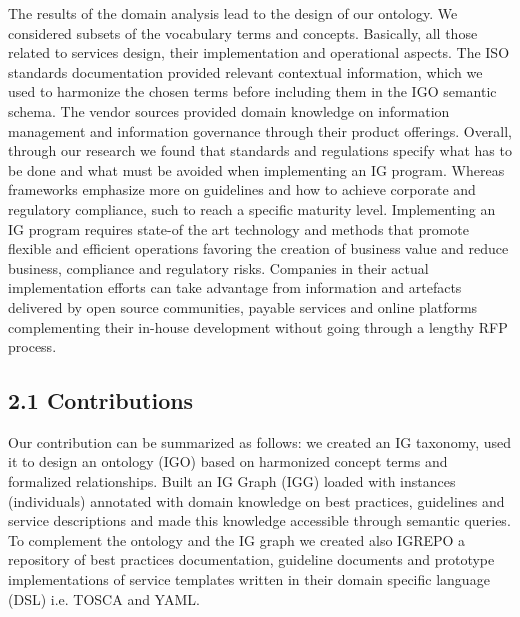 The results of the domain analysis lead to the design of our ontology. We considered subsets of the vocabulary terms and concepts. Basically, all those related to services design, their implementation and operational aspects. The ISO standards documentation provided relevant contextual information, which we used to harmonize the chosen terms before including them in the IGO semantic schema. The vendor sources provided domain knowledge on information management and information governance through their product offerings. Overall, through our research we found that standards and regulations specify what has to be done and what must be avoided when implementing an IG program. Whereas frameworks emphasize more on guidelines and how to achieve corporate and regulatory compliance, such to reach a specific maturity level. Implementing an IG program requires state-of the art technology and methods that promote flexible and efficient operations favoring the creation of business value and reduce business, compliance and regulatory risks. Companies in their actual implementation efforts can take advantage from information and artefacts delivered by open source communities, payable services and online platforms complementing their in-house development without going through a lengthy RFP process. 

\subsection {2.1 Contributions}
Our contribution can be summarized as follows: we created an IG taxonomy, used it to design an ontology (IGO) based on harmonized concept terms and formalized relationships. Built an IG Graph (IGG) loaded with instances (individuals) annotated with domain knowledge on best practices, guidelines and service descriptions and made this knowledge accessible through semantic queries. To complement the ontology and the IG graph we created also   IGREPO a repository of best practices documentation, guideline documents and prototype implementations of service templates written in their domain specific language (DSL) i.e. TOSCA and YAML.
